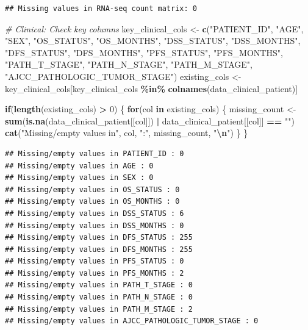 \documentclass[
]{article}
\newenvironment{Shaded}{\begin{snugshade}}{\end{snugshade}}
\newcommand{\CommentTok}[1]{\textcolor[rgb]{0.56,0.35,0.01}{\textit{#1}}}
\newcommand{\ControlFlowTok}[1]{\textcolor[rgb]{0.13,0.29,0.53}{\textbf{#1}}}
\newcommand{\DecValTok}[1]{\textcolor[rgb]{0.00,0.00,0.81}{#1}}
\newcommand{\FunctionTok}[1]{\textcolor[rgb]{0.13,0.29,0.53}{\textbf{#1}}}
\newcommand{\NormalTok}[1]{#1}
\newcommand{\OtherTok}[1]{\textcolor[rgb]{0.56,0.35,0.01}{#1}}
\newcommand{\SpecialCharTok}[1]{\textcolor[rgb]{0.81,0.36,0.00}{\textbf{#1}}}
\newcommand{\StringTok}[1]{\textcolor[rgb]{0.31,0.60,0.02}{#1}}
\begin{document}
\begin{verbatim}
## Missing values in RNA-seq count matrix: 0
\end{verbatim}

\begin{Shaded}
\begin{Highlighting}[]
\CommentTok{\# Clinical: Check key columns}
\NormalTok{key\_clinical\_cols }\OtherTok{\textless{}{-}} \FunctionTok{c}\NormalTok{(}\StringTok{"PATIENT\_ID"}\NormalTok{, }\StringTok{"AGE"}\NormalTok{, }\StringTok{"SEX"}\NormalTok{, }\StringTok{"OS\_STATUS"}\NormalTok{, }\StringTok{"OS\_MONTHS"}\NormalTok{, }\StringTok{"DSS\_STATUS"}\NormalTok{, }\StringTok{"DSS\_MONTHS"}\NormalTok{, }\StringTok{"DFS\_STATUS"}\NormalTok{, }\StringTok{"DFS\_MONTHS"}\NormalTok{, }\StringTok{"PFS\_STATUS"}\NormalTok{, }\StringTok{"PFS\_MONTHS"}\NormalTok{, }\StringTok{"PATH\_T\_STAGE"}\NormalTok{, }\StringTok{"PATH\_N\_STAGE"}\NormalTok{, }\StringTok{"PATH\_M\_STAGE"}\NormalTok{, }\StringTok{"AJCC\_PATHOLOGIC\_TUMOR\_STAGE"}\NormalTok{)}
\NormalTok{existing\_cols }\OtherTok{\textless{}{-}}\NormalTok{ key\_clinical\_cols[key\_clinical\_cols }\SpecialCharTok{\%in\%} \FunctionTok{colnames}\NormalTok{(data\_clinical\_patient)]}

\ControlFlowTok{if}\NormalTok{(}\FunctionTok{length}\NormalTok{(existing\_cols) }\SpecialCharTok{\textgreater{}} \DecValTok{0}\NormalTok{) \{}
  \ControlFlowTok{for}\NormalTok{(col }\ControlFlowTok{in}\NormalTok{ existing\_cols) \{}
\NormalTok{    missing\_count }\OtherTok{\textless{}{-}} \FunctionTok{sum}\NormalTok{(}\FunctionTok{is.na}\NormalTok{(data\_clinical\_patient[[col]]) }\SpecialCharTok{|}\NormalTok{ data\_clinical\_patient[[col]] }\SpecialCharTok{==} \StringTok{""}\NormalTok{)}
    \FunctionTok{cat}\NormalTok{(}\StringTok{"Missing/empty values in"}\NormalTok{, col, }\StringTok{":"}\NormalTok{, missing\_count, }\StringTok{"}\SpecialCharTok{\textbackslash{}n}\StringTok{"}\NormalTok{)}
\NormalTok{  \}}
\NormalTok{\}}
\end{Highlighting}
\end{Shaded}

\begin{verbatim}
## Missing/empty values in PATIENT_ID : 0 
## Missing/empty values in AGE : 0 
## Missing/empty values in SEX : 0 
## Missing/empty values in OS_STATUS : 0 
## Missing/empty values in OS_MONTHS : 0 
## Missing/empty values in DSS_STATUS : 6 
## Missing/empty values in DSS_MONTHS : 0 
## Missing/empty values in DFS_STATUS : 255 
## Missing/empty values in DFS_MONTHS : 255 
## Missing/empty values in PFS_STATUS : 0 
## Missing/empty values in PFS_MONTHS : 2 
## Missing/empty values in PATH_T_STAGE : 0 
## Missing/empty values in PATH_N_STAGE : 0 
## Missing/empty values in PATH_M_STAGE : 2 
## Missing/empty values in AJCC_PATHOLOGIC_TUMOR_STAGE : 0
\end{verbatim}
\end{document}

